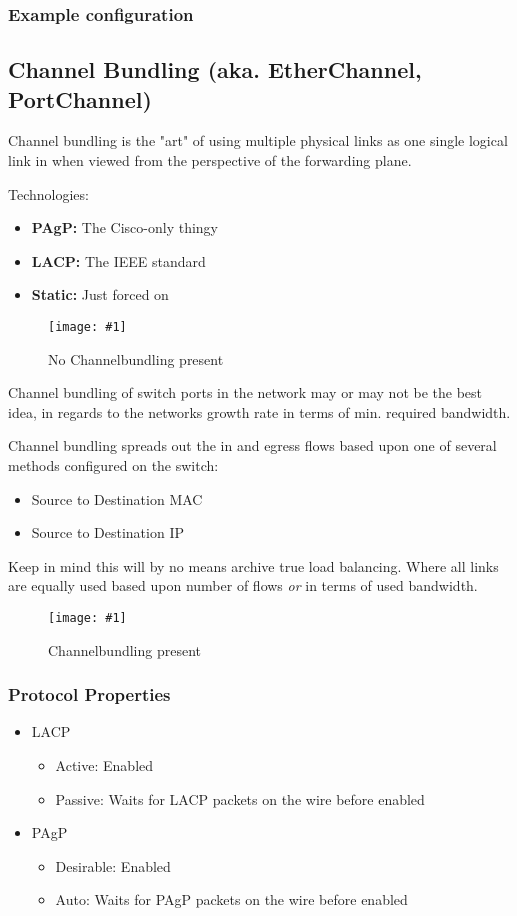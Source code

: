 \documentclass[a4paper,12pt,twoside,twocolumn]{book}
\newcommand{\fig}[3]{
\begin{figure}[h]
    \centering
    \texttt{[image: \#1]}
    \caption{#3}
    \label{fig:#2}
\end{figure}
}
\begin{document}
\subsubsection{Example configuration}


\subsection{Channel Bundling (aka. EtherChannel, PortChannel)}
Channel bundling is the "art" of using multiple physical links as one single logical link in when viewed from the perspective of the forwarding plane.

Technologies:
\begin{itemize}
    \item \textbf{PAgP:} The Cisco-only thingy
    \item \textbf{LACP:} The IEEE standard
    \item \textbf{Static:} Just forced on
\end{itemize}

\fig{channelbundling/network-without-channelbundling}{noethernetchannel}%
{No Channelbundling present}

Channel bundling of switch ports in the network may or may not be the best idea, in regards to the networks growth rate in terms of min. required bandwidth.

Channel bundling spreads out the in and egress flows based upon one of several methods configured on the switch:
\begin{itemize}
    \item Source to Destination MAC
    \item Source to Destination IP
\end{itemize}
Keep in mind this will by no means archive true load balancing. Where all links are equally used based upon number of flows \textit{or} in terms of used bandwidth.

\fig{channelbundling/network-with-channelbundling}{withethernetchannel}%
{Channelbundling present}

\subsubsection{Protocol Properties}

\begin{itemize}
    \item LACP
    \begin{itemize}
        \item Active: Enabled
        \item Passive: Waits for LACP packets on the wire before enabled
    \end{itemize}
    \item PAgP
    \begin{itemize}
        \item Desirable: Enabled
        \item Auto: Waits for PAgP packets on the wire before enabled
    \end{itemize}
\end{itemize}
\end{document}
